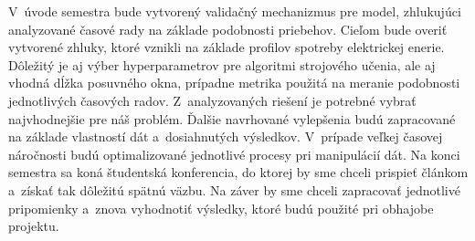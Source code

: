 \documentclass[a4paper,twoside,slovak,12pt,appendix]{article}
\begin{document}
\begin{appendices}
\noindent
V~úvode semestra bude vytvorený validačný mechanizmus pre model, zhlukujúci
analyzované časové rady na základe podobnosti priebehov. Cieľom bude overiť
vytvorené zhluky, ktoré vznikli na základe profilov spotreby elektrickej enerie.
Dôležitý je aj výber hyperparametrov pre algoritmi strojového učenia, ale aj
vhodná dĺžka posuvného okna, prípadne metrika použitá na meranie podobnosti
jednotlivých časových radov. Z~analyzovaných riešení je potrebné vybrať
najvhodnejšie pre náš problém. Ďalšie navrhované vylepšenia budú zapracované na
základe vlastností dát a~dosiahnutých výsledkov. V~prípade veľkej časovej
náročnosti budú optimalizované jednotlivé procesy pri manipulácií dát. Na konci
semestra sa koná študentská konferencia, do ktorej by sme chceli prispieť
článkom a~získať tak dôležitú spätnú väzbu. Na záver by sme chceli zapracovať
jednotlivé pripomienky a~znova vyhodnotiť výsledky, ktoré budú použité pri
obhajobe projektu.


\end{appendices}
\end{document}
